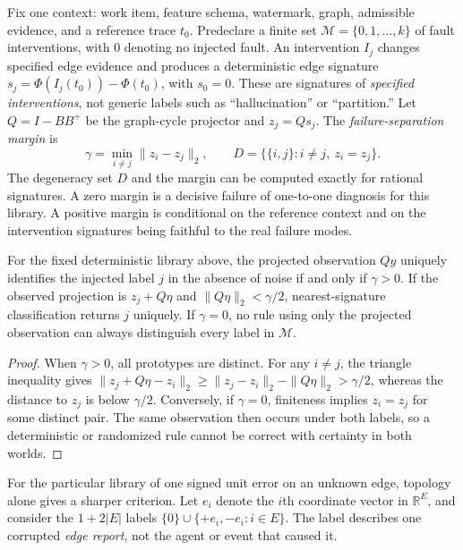 \documentclass[11pt,a4paper]{article}
\begin{document}
Fix one context: work item, feature schema, watermark, graph, admissible evidence, and a reference trace $t_0$. Predeclare a finite set $\mathcal M=\{0,1,\ldots,k\}$ of fault interventions, with $0$ denoting no injected fault. An intervention $I_j$ changes specified edge evidence and produces a deterministic edge signature $s_j=\Phi(I_j(t_0))-\Phi(t_0)$, with $s_0=0$. These are signatures of \emph{specified interventions}, not generic labels such as ``hallucination'' or ``partition.'' Let $Q=I-BB^+$ be the graph-cycle projector and $z_j=Qs_j$. The \emph{failure-separation margin} is
\begin{equation}\label{eq:margin}
\gamma=\min_{i\ne j}\|z_i-z_j\|_2,
\qquad
D=\bigl\{\{i,j\}:i\ne j,\ z_i=z_j\bigr\}.
\end{equation}
The degeneracy set $D$ and the margin can be computed exactly for rational signatures. A zero margin is a decisive failure of one-to-one diagnosis for this library. A positive margin is conditional on the reference context and on the intervention signatures being faithful to the real failure modes.

\begin{theorem}\label{thm:failure-identifiability}
For the fixed deterministic library above, the projected observation $Qy$ uniquely identifies the injected label $j$ in the absence of noise if and only if $\gamma>0$. If the observed projection is $z_j+Q\eta$ and $\|Q\eta\|_2<\gamma/2$, nearest-signature classification returns $j$ uniquely. If $\gamma=0$, no rule using only the projected observation can always distinguish every label in $\mathcal M$.
\end{theorem}
\begin{proof}
When $\gamma>0$, all prototypes are distinct. For any $i\ne j$, the triangle inequality gives
$\|z_j+Q\eta-z_i\|_2\ge\|z_j-z_i\|_2-\|Q\eta\|_2>\gamma/2$, whereas the distance to $z_j$ is below $\gamma/2$. Conversely, if $\gamma=0$, finiteness implies $z_i=z_j$ for some distinct pair. The same observation then occurs under both labels, so a deterministic or randomized rule cannot be correct with certainty in both worlds.
\end{proof}

For the particular library of one signed unit error on an unknown edge, topology alone gives a sharper criterion. Let $e_i$ denote the $i$th coordinate vector in $\mathbb R^E$, and consider the $1+2|E|$ labels $\{0\}\cup\{+e_i,-e_i:i\in E\}$. The label describes one corrupted \emph{edge report}, not the agent or event that caused it.
\end{document}
